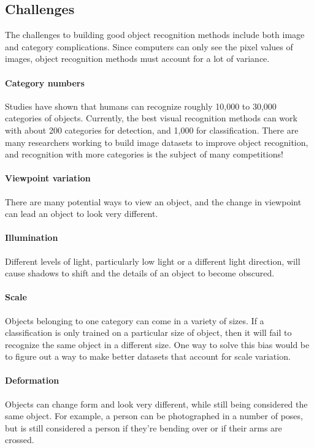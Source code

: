 \documentclass{article}
\begin{document}
\subsection{Challenges}
The challenges to building good object recognition methods include both image and category complications. Since computers can only see the pixel values of images, object recognition methods must account for a lot of variance.

\paragraph{Category numbers}
Studies have shown that humans can recognize roughly 10,000 to 30,000 categories of objects. Currently, the best visual recognition methods can work with about 200 categories for detection, and 1,000 for classification. There are many researchers working to build image datasets to improve object recognition, and recognition with more categories is the subject of many competitions!

\paragraph{Viewpoint variation} There are many potential ways to view an object, and the change in viewpoint can lead an object to look very different.

\paragraph{Illumination} Different levels of light, particularly low light or a different light direction, will cause shadows to shift and the details of an object to become obscured.

\paragraph{Scale} Objects belonging to one category can come in a variety of sizes. If a classification is only trained on a particular size of object, then it will fail to recognize the same object in a different size. One way to solve this bias would be to figure out a way to make better datasets that account for scale variation.

\paragraph{Deformation} Objects can change form and look very different, while still being considered the same object. For example, a person can be photographed in a number of poses, but is still considered a person if they're bending over or if their arms are crossed.
\end{document}
